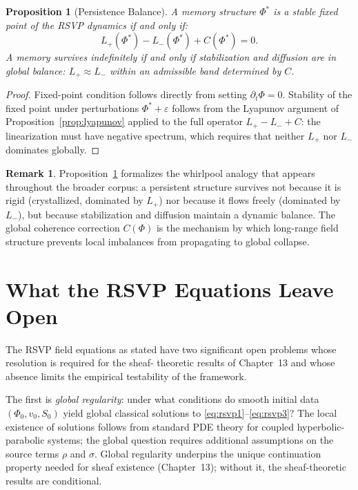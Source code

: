 \documentclass[12pt, oneside]{book}
\theoremstyle{flyxion}
\newtheorem{proposition}[theorem]{Proposition}
\theoremstyle{definition}
\newtheorem{remark}[theorem]{Remark}
\begin{document}
\begin{proposition}[Persistence Balance]
\label{prop:persistence_balance}
A memory structure $\Phi^*$ is a stable fixed point of the
RSVP dynamics if and only if:
\[
L_+(\Phi^*) - L_-(\Phi^*) + C(\Phi^*) = 0.
\]
A memory survives indefinitely if and only if stabilization
and diffusion are in global balance: $L_+ \approx L_-$ within
an admissible band determined by $C$.
\end{proposition}

\begin{proof}
Fixed-point condition follows directly from setting
$\partial_t \Phi = 0$. Stability of the fixed point under
perturbations $\Phi^* + \varepsilon$ follows from the Lyapunov
argument of Proposition~\ref{prop:lyapunov} applied to the
full operator $L_+ - L_- + C$: the linearization must have
negative spectrum, which requires that neither $L_+$ nor $L_-$
dominates globally.
\end{proof}

\begin{remark}
Proposition~\ref{prop:persistence_balance} formalizes the
whirlpool analogy that appears throughout the broader corpus:
a persistent structure survives not because it is rigid
(crystallized, dominated by $L_+$) nor because it flows freely
(dominated by $L_-$), but because stabilization and diffusion
maintain a dynamic balance. The global coherence correction
$C(\Phi)$ is the mechanism by which long-range field structure
prevents local imbalances from propagating to global collapse.
\end{remark}

\section{What the RSVP Equations Leave Open}

The RSVP field equations as stated have two significant
open problems whose resolution is required for the sheaf-
theoretic results of Chapter~13 and whose absence limits
the empirical testability of the framework.

The first is \textit{global regularity}: under what
conditions do smooth initial data $(\Phi_0, v_0, S_0)$
yield global classical solutions to
\eqref{eq:rsvp1}--\eqref{eq:rsvp3}? The local existence
of solutions follows from standard PDE theory for coupled
hyperbolic-parabolic systems; the global question requires
additional assumptions on the source terms $\rho$ and
$\sigma$. Global regularity underpins the unique
continuation property needed for sheaf existence
(Chapter~13); without it, the sheaf-theoretic results
are conditional.
\end{document}
